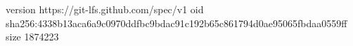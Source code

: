 version https://git-lfs.github.com/spec/v1
oid sha256:4338b13aca6a9c0970ddfbc9bdac91c192b65c861794d0ae95065fbdaa0559ff
size 1874223
